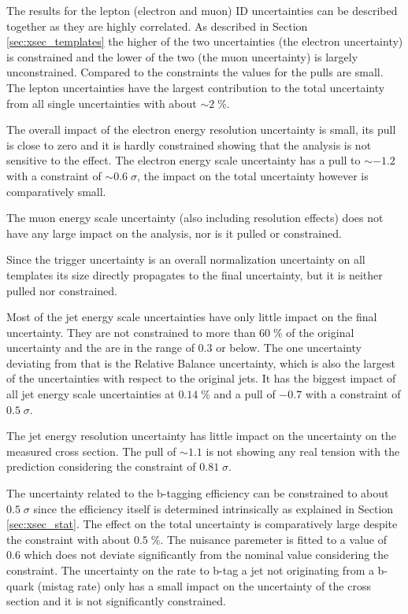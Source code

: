 The results for the lepton (electron and muon) ID uncertainties can be described together as they are highly correlated.
As described in Section \ref{sec:xsec_templates} the higher of the two uncertainties (the electron uncertainty) is constrained and
the lower of the two (the muon uncertainty) is largely unconstrained. Compared to the constraints the values for the pulls 
are small. The lepton uncertainties have the largest contribution to the total uncertainty from all single uncertainties with about $\sim 2 \; \%$. 

The overall impact of the electron energy resolution uncertainty is small, its pull is close to zero and it is hardly constrained showing
that the analysis is not sensitive to the effect.
The electron energy scale uncertainty has a pull to $\sim -1.2$ with a constraint of $\sim 0.6 \; \sigma$, the impact on the total uncertainty however is comparatively small.

The muon energy scale uncertainty (also including resolution effects) does not have any large impact on the analysis, nor is it pulled or constrained.

Since the trigger uncertainty is an overall normalization uncertainty on all templates its size directly propagates to the final uncertainty, but it is neither pulled nor constrained.  

Most of the jet energy scale uncertainties have only little impact on the final uncertainty. They are not constrained to more than $60 \; \%$ of the original uncertainty and the are in the range of $0.3$ or below.
The one uncertainty deviating from that is the Relative Balance uncertainty, which is also the largest of the uncertainties with respect to the original jets.
It has the biggest impact of all jet energy scale uncertainties at $0.14 \; \%$ and a pull of $-0.7$ with a constraint of $0.5\; \sigma$.

The jet energy resolution uncertainty has little impact on the uncertainty on the measured cross section. The pull of $\sim 1.1$ is not showing any real tension with the prediction considering the constraint of $0.81 \; \sigma$.

The uncertainty related to the b-tagging efficiency can be constrained to about $0.5 \; \sigma$ since the efficiency itself is determined intrinsically as explained in Section \ref{sec:xsec_stat}.
The effect on the total uncertainty is comparatively large despite the constraint with about $0.5 \; \%$.
The nuisance paremeter is fitted to a value of $0.6$ which does not deviate significantly from the nominal value considering the constraint.
The uncertainty on the rate to b-tag a jet not originating from a b-quark (mistag rate) only has a small impact on the uncertainty of the cross section and it is not significantly constrained.


